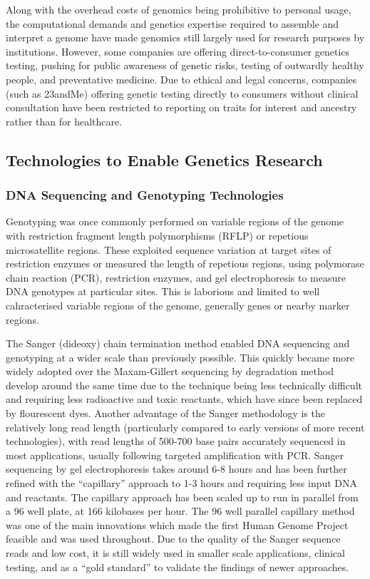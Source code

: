 Along with the overhead costs of genomics being prohibitive to personal usage, the computational demands and genetics expertise required to assemble and interpret a genome have made genomics still largely used for research purposes by institutions. However, some companies are offering direct-to-consumer genetics testing, pushing for public awareness of genetic risks, testing of outwardly healthy people, and preventative medicine. Due to ethical and legal concerns, companies (such as 23andMe) offering genetic testing directly to consumers without clinical consultation have been restricted to reporting on traits for interest and ancestry rather than for healthcare.

\subsection{Technologies to Enable Genetics Research}
\subsubsection{DNA Sequencing and Genotyping Technologies}
Genotyping was once commonly performed on variable regions of the genome with restriction fragment length polymorphisms (RFLP) or repetious microsatellite regions. These exploited sequence variation at target sites of restriction enzymes or measured the length of repetious regions, using polymorase chain reaction (PCR), restriction enzymes, and gel electrophoresis to measure DNA genotypes at particular sites. This is laborious and limited to well cahracterised variable regions of the genome, generally genes or nearby marker regions. 

The Sanger (dideoxy) chain termination method enabled DNA sequencing and genotyping at a wider scale than previously possible. This quickly became more widely adopted  over the Maxam-Gillert sequencing by degradation method develop around the same time due to the technique being less technically difficult and requiring less radioactive and toxic reactants, which have since been replaced by flourescent dyes. Another advantage of the Sanger methodology is the relatively long read length (particularly compared to early versions of more recent technologies), with read lengths of 500-700 base pairs accurately sequenced in most applications, usually following targeted amplification with PCR. Sanger sequencing by gel electrophoresis takes around 6-8 hours and has been further refined with the ``capillary'' approach to 1-3 hours and requiring less input DNA and reactants. The capillary approach has been scaled up to run in parallel from a 96 well plate, at 166 kilobases per hour. The 96 well parallel capillary method was one of the main innovations which made the first Human Genome Project feasible and was used throughout. Due to the quality of the Sanger sequence reads and low cost, it is still widely used in smaller scale applications, clinical testing, and as a ``gold standard'' to validate the findings of newer approaches.


